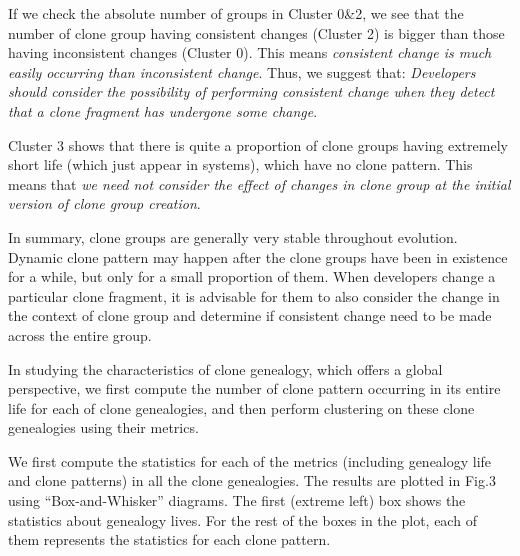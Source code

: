 If we check the absolute number of groups in Cluster 0\&2, we see that the number of clone group having consistent changes (Cluster 2) is bigger than those having inconsistent changes (Cluster 0).  This means {\em consistent change is much easily occurring than inconsistent change}. Thus, we suggest that: {\em Developers should consider the possibility of performing consistent change when they detect that a clone fragment has undergone some change}.  

Cluster 3 shows that there is quite a proportion of clone groups having extremely short life (which just appear in systems), which have no clone pattern. This means that {\em we need not consider the effect of changes in clone group at the initial version of clone group creation}.   

In summary, clone groups are generally very stable throughout evolution. Dynamic clone pattern may happen after the clone groups have been in existence for a while, but only for a small proportion of them. When developers change a particular clone fragment, it is advisable for them to also consider the change in the context of clone group and determine if consistent change need to be made across the entire group.


In studying the characteristics of clone genealogy, which offers a global perspective, we first compute the number of clone pattern occurring in its entire life for each of clone genealogies, and then perform clustering on these clone genealogies using their metrics. 

We first compute the statistics for each of the metrics (including genealogy life and clone patterns) in all the clone genealogies. The results are plotted in Fig.3 using ``Box-and-Whisker'' diagrams.  The first (extreme left) box shows the statistics about genealogy lives. For the rest of the boxes in the plot, each of them represents the statistics for each clone pattern. 

